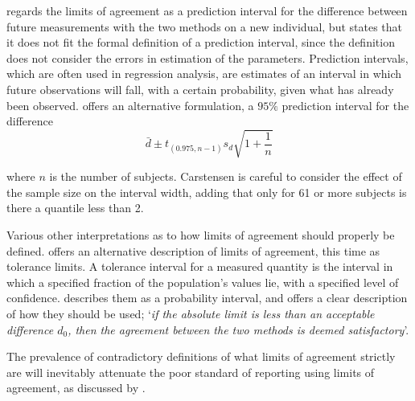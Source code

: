 \documentclass[12pt, a4paper]{report}
\theoremstyle{plain}
\theoremstyle{definition}
\theoremstyle{remark}
\begin{document}
\citet{BXC2008} regards the limits of agreement as a prediction interval for the difference between future measurements with the two methods on a new individual, but states that it does not fit
the formal definition of a prediction interval, since the definition does not consider the errors in estimation of the
parameters. Prediction intervals, which are often used in regression analysis, are estimates of an interval in which future
observations will fall, with a certain probability, given what has already been observed. \citet{BXC2008} offers an alternative formulation, a $95\%$ prediction interval for the difference
\[
\bar{d} \pm t_{(0.975, n-1)}s_{d} \sqrt{1+\frac{1}{n}}
\]

\noindent where $n$ is the number of subjects. Carstensen is
careful to consider the effect of the sample size on the interval
width, adding that only for 61 or more subjects is there a
quantile less than 2.

Various other interpretations as to how limits of agreement should properly be defined. \citet{luiz} offers an alternative description of limits of
agreement, this time as tolerance limits. A tolerance interval for
a measured quantity is the interval in which a specified fraction
of the population's values lie, with a specified level of
confidence. \citet{Barnhart} describes them as a probability
interval, and offers a clear description of how they should be
used; `\textit{if the absolute limit is less than an acceptable difference
	$d_{0}$, then the agreement between the two methods is deemed
	satisfactory}'.

The prevalence of contradictory definitions of what limits of agreement strictly are will inevitably attenuate the poor standard of reporting using limits of agreement, as discussed by \citet{mantha}.


\end{document}
